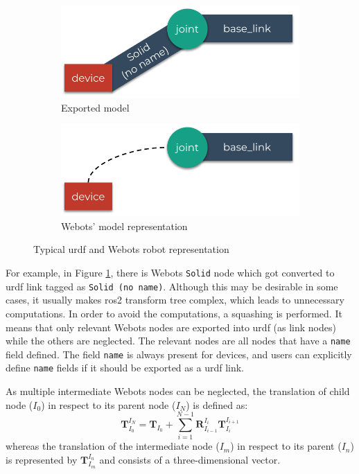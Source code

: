 \begin{figure}[H]
\centering
\begin{subfigure}{\textwidth}
  \centering
  \includegraphics[width=.7\linewidth]{generalization/figures/squashing_transforms_actual.pdf}
  \caption{Exported model}
  \label{fig:generalization:squashing_transforms:actual}
\end{subfigure}
\begin{subfigure}{\textwidth}
  \centering
  \includegraphics[width=.7\linewidth]{generalization/figures/squashing_transforms_desired.pdf}
  \caption{Webots' model representation}
  \label{fig:generalization:squashing_transforms:desired}
\end{subfigure}
\caption{Typical \ac{urdf} and Webots robot representation}
\label{fig:generalization:squashing_transforms}
\end{figure}

For example, in Figure \ref{fig:generalization:squashing_transforms:actual}, there is Webots \texttt{Solid} node which got converted to \ac{urdf} link tagged as \texttt{Solid (no name)}. 
Although this may be desirable in some cases, it usually makes \ac{ros2} transform tree complex, which leads to unnecessary computations.
In order to avoid the computations, a squashing is performed.
It means that only relevant Webots nodes are exported into \ac{urdf} (as link nodes) while the others are neglected.
The relevant nodes are all nodes that have a \texttt{name} field defined.
The field \texttt{name} is always present for devices, and users can explicitly define \texttt{name} fields if it should be exported as a \ac{urdf} link.

As multiple intermediate Webots nodes can be neglected, the translation of child node ($I_0$) in respect to its parent node ($I_N$) is defined as:
\begin{equation}
    \bm{T}_{I_0}^{I_N} = \bm{T}_{I_0} + \sum_{i=1}^{N-1} \bm{R}_{I_{i-1}}^{I_i} \bm{T}_{I_i}^{I_{i+1}}
\end{equation}
whereas the translation of the intermediate node ($I_m$) in respect to its parent ($I_n$) is represented by $ \bm{T}_{I_m}^{I_n} $ and consists of a three-dimensional vector.


